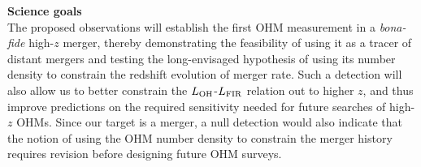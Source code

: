 \documentclass[letterpaper,11pt]{article}
\newcommand{\LFIR}{\mbox{$L_{\rm FIR}$}\xspace}
\newcommand{\LOH}{$L_{\rm OH}$\xspace}
\newcommand{\obs}{observations\xspace}
\begin{document}
\noindent \textbf{Science goals}
\vspace{.2em}\\
The proposed \obs will establish the first OHM measurement in a {\it bona-fide} high-$z$ merger, thereby
demonstrating the feasibility of using it as a tracer of distant mergers and 
testing the long-envisaged hypothesis of using its number density to constrain 
the redshift evolution of merger rate. 
Such a detection will also allow us to better constrain the
\LOH-\LFIR relation out to higher $z$, %
and thus improve predictions on the required sensitivity needed for future searches of high-$z$ OHMs.
Since our target is a merger, 
a null detection would also indicate that the notion of 
using the OHM number density to constrain the merger history requires revision before designing future OHM surveys.
\end{document}
